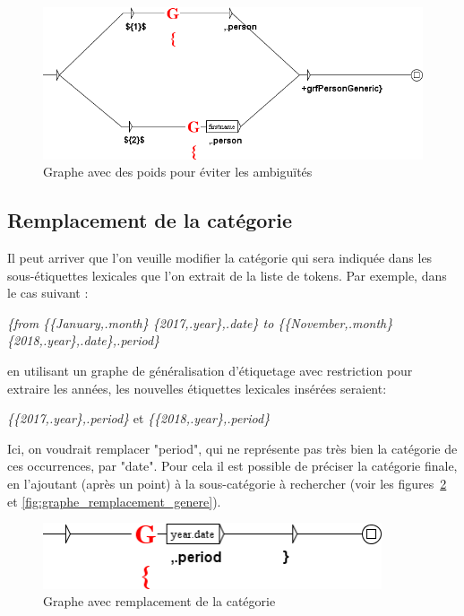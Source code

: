 \begin{figure}[!htb]
  \centering
  \includegraphics[width=14cm]{resources/img/graphe_poids.png}
  \caption{Graphe avec des poids pour éviter les ambiguïtés}
  \label{fig:graphe_poids}
\end{figure}

\subsection{Remplacement de la catégorie}

Il peut arriver que l'on veuille modifier la catégorie qui sera indiquée
dans les sous-étiquettes lexicales que l'on extrait de la liste de tokens.
Par exemple, dans le cas suivant :

\bigskip
\noindent \emph{\{from \{\{January,.month\} \{2017,.year\},.date\} to \{\{November,.month\} \{2018,.year\},.date\},.period\}}

\bigskip
\noindent en utilisant un graphe de généralisation d'étiquetage avec restriction pour extraire
les années, les nouvelles étiquettes lexicales insérées seraient:

\bigskip
\emph{\{\{2017,.year\},.period\}} et \emph{\{\{2018,.year\},.period\}}

\bigskip
\noindent Ici, on voudrait remplacer "period", qui ne représente pas très bien la catégorie
de ces occurrences, par "date".
 Pour cela il est possible de préciser la catégorie finale, en l'ajoutant
(après un point) à la sous-catégorie à rechercher (voir les figures~\ref{fig:graphe_remplacement}
et \ref{fig:graphe_remplacement_genere}).

\begin{figure}[!htb]
  \centering
  \includegraphics[width=10cm]{resources/img/graphe_remplacement.png}
  \caption{Graphe avec remplacement de la catégorie}
  \label{fig:graphe_remplacement}
\end{figure}

